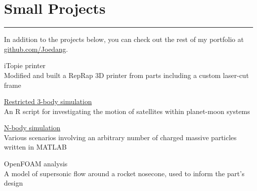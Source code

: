 \section{Small Projects}
\noindent\rule{\textwidth}{\hlinewidth}
In addition to the projects below, you can check out the rest of my portfolio at 
\href{https://github.com/Joedang}{github.com/Joedang}.
	\begin{innerlist}
    \item iTopie printer \\
    Modified and built a RepRap 3D printer from parts including a custom laser-cut frame
	\item \href{https://github.com/Joedang/restricted\_three\_body\_problem}{Restricted 3-body simulation} \\
	An R script for investigating the motion of satellites within planet-moon systems
	\item \href{https://github.com/Joedang/Portfolio/tree/master/MATLAB\_orbits}{N-body simulation} \\
	Various scenarios involving an arbitrary number of charged massive particles written in MATLAB
	\item OpenFOAM analysis\\
	A model of supersonic flow around a rocket nosecone, used to inform the part's design
	\end{innerlist}

